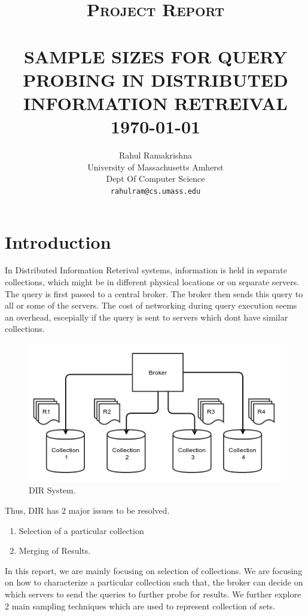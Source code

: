 \documentclass[paper=a4, fontsize=11pt,twoside]{scrartcl}	%
\title{	\normalsize \textsc{Project Report} 	%
		 	\\[2.0cm]								%
			\HRule{0.5pt} \\						%
			\LARGE \textbf{\uppercase{Sample Sizes for Query Probing in Distributed Information Retreival}}	%
			\HRule{2pt} \\ [0.5cm]		%
			\normalsize \today			%
		}
\author{
		Rahul Ramakrishna\\	
		University of Massachusetts Amherst\\	
		Dept Of Computer Science\\
        \texttt{rahulram@cs.umass.edu} \\
}
\makeatletter
\def\printtitle{%
    {\centering \@title\par}}
\def\printauthor{%
    {\centering \large \@author}}
\makeatother
\begin{document}
\thispagestyle{empty}		%

\printtitle					%
  	\vfill
\printauthor				%
\newpage
\setcounter{page}{1}		%
\section{Introduction}

In Distributed Information Reterival systems, information is held in separate collections, which might be in different physical locations or on separate servers. The query is first passed to a central
broker. The broker then sends this query to all or some of the servers. The cost of networking during query execution seems an overhead, escepially if the query is sent to servers which dont have similar collections.

\begin{figure}[H]
\centering
\includegraphics[width=\textwidth]{./img/ir.png}
\caption{\label{fig:1}DIR System.}
\end{figure}


Thus, DIR has 2 major issues to be resolved. 
\begin{enumerate}
\item Selection of a particular collection
\item Merging of Results.
\end{enumerate}
In this report, we are mainly focusing on selection of collections. We are focusing on how to characterize a 
particular collection such that, the broker can decide on which servers to send the queries to further probe for 
results. We further explore 2 main sampling techniques which are used to represent collection of sets.
\end{document}
